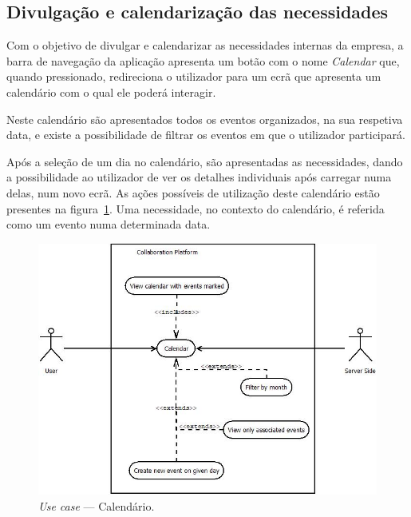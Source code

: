 \newpage

\subsection{Divulgação e calendarização das necessidades}

Com o objetivo de divulgar e calendarizar as necessidades internas da empresa, a barra de navegação da aplicação apresenta um botão com o nome \textit{Calendar} que, quando pressionado, 
redireciona o utilizador para um ecrã que apresenta um calendário com o qual ele poderá interagir. 
\par
Neste calendário são apresentados todos os eventos organizados, na sua respetiva data, e existe a possibilidade de filtrar os eventos em que o utilizador participará. 
\par
Após a seleção de um dia no calendário, são apresentadas as necessidades, dando a possibilidade ao utilizador de ver os detalhes individuais após carregar numa delas, 
num novo ecrã.
As ações possíveis de utilização deste calendário estão presentes na figura~\ref{fig:uc:calendar}. 
Uma necessidade, no contexto do calendário, é referida como um evento numa determinada data. 

\begin{figure}[H]
    \centering
    \includegraphics[scale=0.6]{figures/Calendar use case.jpeg}
    \caption{\textit{Use case} --- Calendário.}\label{fig:uc:calendar}
\end{figure}

